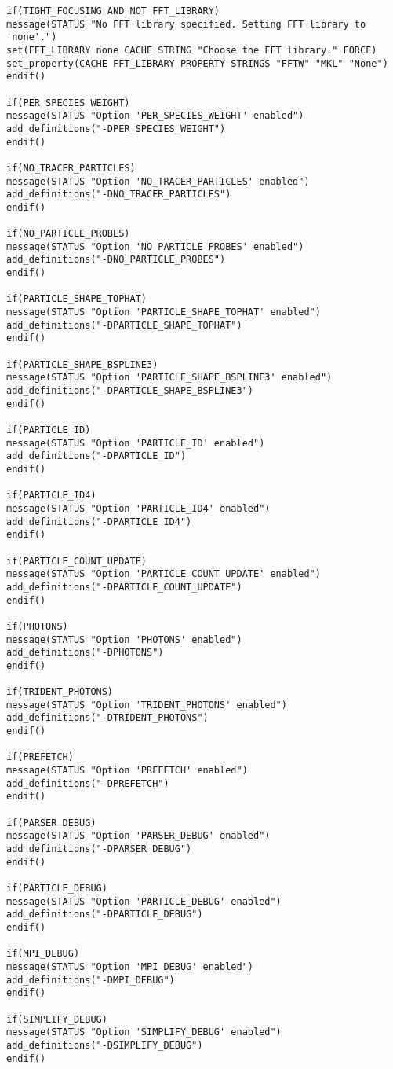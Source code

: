 \begin{lstlisting}[style=FORTRAN, caption=EPOCH CMakeLists file to generate platform-specific build scripts]
if(TIGHT_FOCUSING AND NOT FFT_LIBRARY)
message(STATUS "No FFT library specified. Setting FFT library to 'none'.")
set(FFT_LIBRARY none CACHE STRING "Choose the FFT library." FORCE)
set_property(CACHE FFT_LIBRARY PROPERTY STRINGS "FFTW" "MKL" "None")
endif()

if(PER_SPECIES_WEIGHT)
message(STATUS "Option 'PER_SPECIES_WEIGHT' enabled")
add_definitions("-DPER_SPECIES_WEIGHT")
endif()

if(NO_TRACER_PARTICLES)
message(STATUS "Option 'NO_TRACER_PARTICLES' enabled")
add_definitions("-DNO_TRACER_PARTICLES")
endif()

if(NO_PARTICLE_PROBES)
message(STATUS "Option 'NO_PARTICLE_PROBES' enabled")
add_definitions("-DNO_PARTICLE_PROBES")
endif()

if(PARTICLE_SHAPE_TOPHAT)
message(STATUS "Option 'PARTICLE_SHAPE_TOPHAT' enabled")
add_definitions("-DPARTICLE_SHAPE_TOPHAT")
endif()

if(PARTICLE_SHAPE_BSPLINE3)
message(STATUS "Option 'PARTICLE_SHAPE_BSPLINE3' enabled")
add_definitions("-DPARTICLE_SHAPE_BSPLINE3")
endif()

if(PARTICLE_ID)
message(STATUS "Option 'PARTICLE_ID' enabled")
add_definitions("-DPARTICLE_ID")
endif()

if(PARTICLE_ID4)
message(STATUS "Option 'PARTICLE_ID4' enabled")
add_definitions("-DPARTICLE_ID4")
endif()

if(PARTICLE_COUNT_UPDATE)
message(STATUS "Option 'PARTICLE_COUNT_UPDATE' enabled")
add_definitions("-DPARTICLE_COUNT_UPDATE")
endif()

if(PHOTONS)
message(STATUS "Option 'PHOTONS' enabled")
add_definitions("-DPHOTONS")
endif()

if(TRIDENT_PHOTONS)
message(STATUS "Option 'TRIDENT_PHOTONS' enabled")
add_definitions("-DTRIDENT_PHOTONS")
endif()

if(PREFETCH)
message(STATUS "Option 'PREFETCH' enabled")
add_definitions("-DPREFETCH")
endif()

if(PARSER_DEBUG)
message(STATUS "Option 'PARSER_DEBUG' enabled")
add_definitions("-DPARSER_DEBUG")
endif()

if(PARTICLE_DEBUG)
message(STATUS "Option 'PARTICLE_DEBUG' enabled")
add_definitions("-DPARTICLE_DEBUG")
endif()

if(MPI_DEBUG)
message(STATUS "Option 'MPI_DEBUG' enabled")
add_definitions("-DMPI_DEBUG")
endif()

if(SIMPLIFY_DEBUG)
message(STATUS "Option 'SIMPLIFY_DEBUG' enabled")
add_definitions("-DSIMPLIFY_DEBUG")
endif()


\end{lstlisting}
